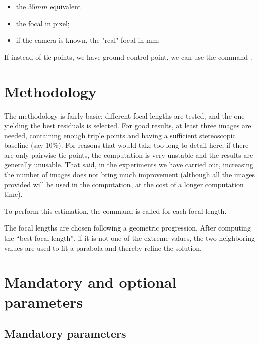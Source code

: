 \documentclass[a4paper]{article}
\begin{document}
\begin{itemize}
  \item the $35mm$ equivalent 
  \item  the focal in pixel;
  \item  if the camera is known, the "real" focal in mm;
\end{itemize}

If instead of tie points, we have ground control point, we can use the command
.


\section{Methodology}

The methodology is fairly basic: different focal lengths are tested, and the one yielding the best residuals 
is selected. For good results, at least three images are needed, containing enough triple points and having 
a sufficient stereoscopic baseline (say 10\%). For reasons that would take too long to detail here, 
if there are only pairwise tie points, the computation is very unstable and the results are generally unusable. 
That said, in the experiments we have carried out, increasing the number of images does not bring much improvement 
(although all the images provided will be used in the computation, at the cost of a longer computation time).

To perform this estimation, the command  is called for each focal length.


The focal lengths are chosen following a geometric progression. After computing the “best focal length”, 
if it is not one of the extreme values, the two neighboring values are used to fit a parabola and thereby 
refine the solution.



\section{Mandatory and optional parameters}


\subsection{Mandatory parameters}
\end{document}
